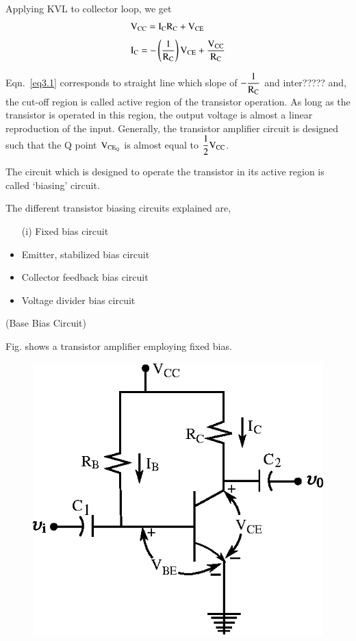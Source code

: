 Applying KVL to collector loop, we get
\begin{align}
& \textrm{V}_{\text{CC}} = \textrm{I}_{\textrm{C}}\textrm{R}_{\textrm{C}}+\textrm{V}_{\text{CE}}\notag\\[3pt]
& \textrm{I}_{\textrm{C}}=-\left(\frac{1}{\textrm{R}_{\textrm{C}}}\right)\textrm{V}_{\text{CE}}+\frac{\textrm{V}_{\text{CC}}}{\textrm{R}_{\textrm{C}}}\label{eq3.1}
\end{align}

Eqn.~\eqref{eq3.1} corresponds to straight line which slope of $-\dfrac{1}{\textrm{R}_{\textrm{C}}}$ and inter????? and, the cut-off region is called active region of the transistor operation. As long as the transistor is operated in this region, the output voltage is almost a linear reproduction of the input. Generally, the transistor amplifier circuit is designed such that the Q point $\textrm{V}_{\text{CE}_{\textrm{Q}}}$ is almost equal to $\dfrac{1}{2}\textrm{V}_{\text{CC}}$.

The circuit which is designed to operate the transistor in its active region is called `biasing' circuit.

The different transistor biasing circuits explained are,
\begin{itemize}
\item[(i)] Fixed bias circuit

\item Emitter, stabilized bias circuit

\item Collector feedback bias circuit

\item Voltage divider bias circuit
\end{itemize}

 (Base Bias Circuit)

Fig. shows a transistor amplifier employing fixed bias.
\begin{figure}[H]
\centering
\includegraphics{chap3/fig3.3.eps}
\end{figure}

